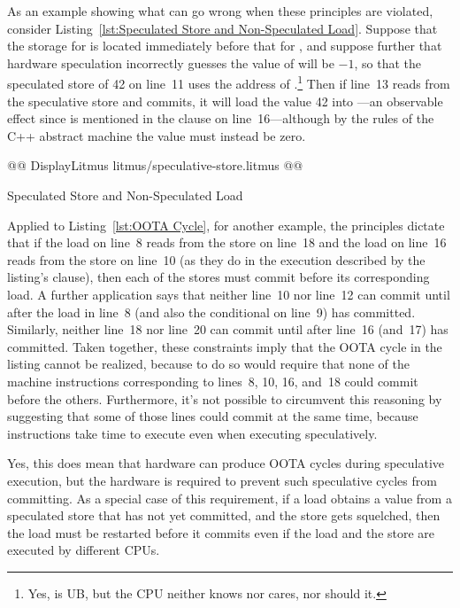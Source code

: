\documentclass[10]{article}
\begin{document}
As an example showing what can go wrong when these principles are
violated, consider Listing~\ref{lst:Speculated Store and Non-Speculated Load}.
Suppose that the storage for  is located immediately before that
for , and
suppose further that hardware speculation incorrectly guesses the value
of  will be $-1$, so that the speculated store of 42 on line~11 uses
the address of .\footnote{
	Yes,  is UB, but the CPU neither knows
	nor cares, nor should it.}
Then if line~13 reads from the speculative store and commits, it will load
the value 42 into ---an observable effect since 
is mentioned in the  clause on line~16---although
by the rules of the C++ abstract machine the value must instead be zero.

\begin{listing}[tbp]
@@ DisplayLitmus litmus/speculative-store.litmus @@
\caption{Speculated Store and Non-Speculated Load}
\label{lst:Speculated Store and Non-Speculated Load}
\end{listing}

Applied to Listing~\ref{lst:OOTA Cycle}, for another example,
the principles dictate that if the load on line~8 reads from the store
on line~18 and the load on line~16 reads from the store on line~10
(as they do in the execution described by the listing's  clause),
then each of the stores must commit before its corresponding load.
A further application says that
neither line~10 nor line~12 can commit until after the load
in line~8 (and also the conditional on line~9) has committed.
Similarly, neither line~18 nor line~20 can commit until after line~16
(and~17) has committed.
Taken together, these constraints imply that the OOTA cycle in the
listing cannot be realized, because to do so would require that
none of the machine instructions corresponding to lines~8, 10, 16,
and~18 could commit before the others.
Furthermore, it's not possible to circumvent this reasoning by suggesting
that some of those lines could commit at the same time,
because instructions take time to execute even when executing
speculatively.

Yes, this does mean that hardware can produce OOTA cycles during
speculative execution, but the hardware is required to prevent such
speculative cycles from committing.
As a special case of this requirement, if a load obtains
a value from a speculated store that has not yet committed,
and the store gets squelched,
then the load must be restarted before it commits even if the load and
the store are executed by different CPUs.
\end{document}
